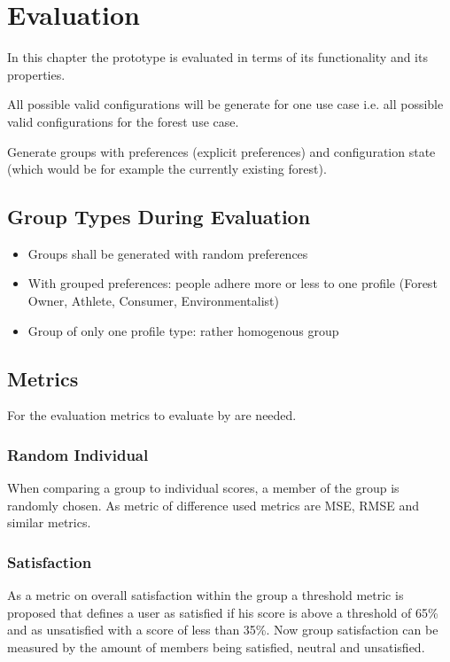 \chapter{Evaluation}
\label{ch:Evaluation}

In this chapter the prototype is evaluated in terms of its functionality and its properties.

All possible valid configurations will be generate for one use case i.e. all possible valid configurations for the forest use case.

Generate groups with preferences (explicit preferences) and configuration state (which would be for example the currently existing forest).

\section{Group Types During Evaluation}
\label{sec:Evaluation:GroupTypes}

\begin{itemize}
    \item Groups shall be generated with random preferences
    \item With grouped preferences: people adhere more or less to one profile (Forest Owner, Athlete, Consumer, Environmentalist)
    \item Group of only one profile type: rather homogenous group
\end{itemize}

\section{Metrics}
For the evaluation metrics to evaluate by are needed. 

\label{sec:Evaluation:Metrics}

\subsection{Random Individual}
When comparing a group to individual scores, a member of the group is randomly chosen. As metric of difference used metrics are MSE, RMSE and similar metrics.

\subsection{Satisfaction}
As a metric on overall satisfaction within the group a threshold metric is proposed that defines a user as satisfied if his score is above a threshold of 65\% and as unsatisfied with a score of less than 35\%. Now group satisfaction can be measured by the amount of members being satisfied, neutral and unsatisfied.

